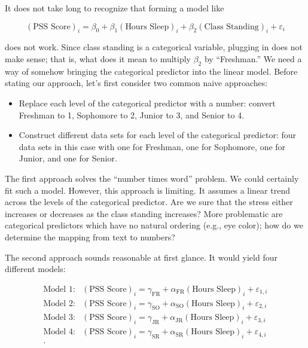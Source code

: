 \documentclass[
]{book}
\providecommand{\tightlist}{%
  \setlength{\itemsep}{0pt}\setlength{\parskip}{0pt}}
\theoremstyle{plain}
\theoremstyle{mydefn}
\theoremstyle{myexmpl}
\theoremstyle{remark}
\begin{document}
It does not take long to recognize that forming a model like

\[(\text{PSS Score})_i = \beta_0 + \beta_1 (\text{Hours Sleep})_i + \beta_2 (\text{Class Standing})_i + \varepsilon_i\]

does not work. Since class standing is a categorical variable, plugging in does not make sense; that is, what does it mean to multiply \(\beta_2\) by ``Freshman.'' We need a way of somehow bringing the categorical predictor into the linear model. Before stating our approach, let's first consider two common naive approaches:

\begin{itemize}
\tightlist
\item
  Replace each level of the categorical predictor with a number: convert Freshman to 1, Sophomore to 2, Junior to 3, and Senior to 4.
\item
  Construct different data sets for each level of the categorical predictor: four data sets in this case with one for Freshman, one for Sophomore, one for Junior, and one for Senior.
\end{itemize}

The first approach solves the ``number times word'' problem. We could certainly fit such a model. However, this approach is limiting. It assumes a linear trend across the levels of the categorical predictor. Are we sure that the stress either increases or decreases as the class standing increases? More problematic are categorical predictors which have no natural ordering (e.g., eye color); how do we determine the mapping from text to numbers?

The second approach sounds reasonable at first glance. It would yield four different models:

\[
\begin{aligned}
  \text{Model 1}:& (\text{PSS Score})_i = \gamma_{\text{FR}} + 
    \alpha_{\text{FR}} (\text{Hours Sleep})_i + \varepsilon_{1,i} \\
  \text{Model 2}:& (\text{PSS Score})_i = \gamma_{\text{SO}} + 
    \alpha_{\text{SO}} (\text{Hours Sleep})_i + \varepsilon_{2,i} \\
  \text{Model 3}:& (\text{PSS Score})_i = \gamma_{\text{JR}} + 
    \alpha_{\text{JR}} (\text{Hours Sleep})_i + \varepsilon_{3,i} \\
  \text{Model 4}:& (\text{PSS Score})_i = \gamma_{\text{SR}} + 
    \alpha_{\text{SR}} (\text{Hours Sleep})_i + \varepsilon_{4,i} \\.
\end{aligned}
\]
\end{document}
